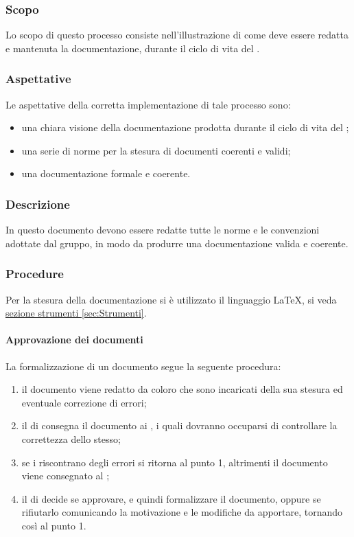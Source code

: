 \subsubsection{Scopo}
Lo scopo di questo processo consiste nell'illustrazione di come deve essere redatta e mantenuta
la documentazione, durante il ciclo di vita del .
\subsubsection{Aspettative}
Le aspettative della corretta implementazione di tale processo sono:
\begin{itemize}
	\item una chiara visione della documentazione prodotta durante il ciclo di vita
del ;
	\item una serie di norme per la stesura di documenti coerenti e validi;
	\item una documentazione formale e coerente.
\end{itemize}
\subsubsection{Descrizione}
In questo documento devono essere redatte tutte le norme e le convenzioni adottate dal gruppo,
in modo da produrre una documentazione valida e coerente.
\subsubsection{Procedure}
Per la stesura della documentazione si è utilizzato il linguaggio \LaTeX, si veda \hyperref[sec:Strumenti]{sezione strumenti \ref*{sec:Strumenti}}.
 \paragraph{Approvazione dei documenti}
La formalizzazione di un documento segue la seguente procedura:
\begin{enumerate}
	\item il documento viene redatto da coloro che sono incaricati della sua stesura ed eventuale correzione di errori;
	\item il \RESP{} di  consegna il documento ai \VERP, i quali dovranno occuparsi di controllare la correttezza dello stesso;
	\item se i \VERP{} riscontrano degli errori si ritorna al punto 1, altrimenti il documento viene consegnato al \RESP ;
	\item il \RESP{} di  decide se approvare, e quindi formalizzare il documento, oppure se rifiutarlo comunicando la motivazione e le modifiche da apportare, tornando così al punto 1.
\end{enumerate}

